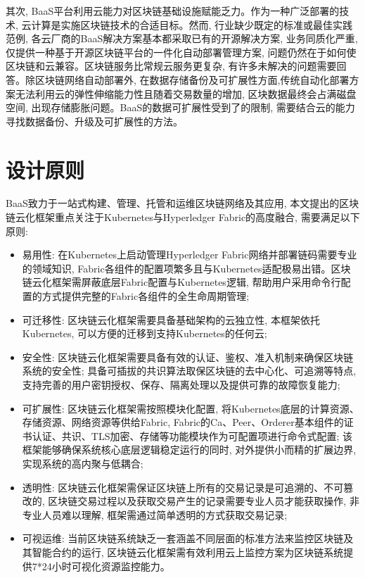 其次, BaaS平台利用云能力对区块链基础设施赋能乏力。作为一种广泛部署的技术, 云计算是实施区块链技术的合适目标。然而, 行业缺少既定的标准或最佳实践范例, 各云厂商的BaaS解决方案基本都采取已有的开源解决方案, 业务同质化严重, 仅提供一种基于开源区块链平台的一件化自动部署管理方案, 问题仍然在于如何使区块链和云兼容\cite{gai2020blockchain}。区块链服务比常规云服务更复杂, 有许多未解决的问题需要回答。除区块链网络自动部署外, 在数据存储备份及可扩展性方面,传统自动化部署方案无法利用云的弹性伸缩能力性且随着交易数量的增加, 区块数据最终会占满磁盘空间, 出现存储膨胀问题。BaaS的数据可扩展性受到了的限制, 需要结合云的能力寻找数据备份、升级及可扩展性的方法。

\section{设计原则}\label{section: framework_characteristics}

BaaS致力于一站式构建、管理、托管和运维区块链网络及其应用, 本文提出的区块链云化框架重点关注于Kubernetes与Hyperledger Fabric的高度融合, 需要满足以下原则:

\begin{itemize}[itemindent=2em]
    \item 易用性: 在Kubernetes上启动管理Hyperledger Fabric网络并部署链码需要专业的领域知识, Fabric各组件的配置项繁多且与Kubernetes适配极易出错。区块链云化框架需屏蔽底层Fabric配置与Kubernetes逻辑, 帮助用户采用命令行配置的方式提供完整的Fabric各组件的全生命周期管理;

    \item 可迁移性: 区块链云化框架需要具备基础架构的云独立性, 本框架依托Kubernetes, 可以方便的迁移到支持Kubernetes的任何云;

    \item 安全性: 区块链云化框架需要具备有效的认证、鉴权、准入机制来确保区块链系统的安全性; 具备可插拔的共识算法取保区块链的去中心化、可追溯等特点, 支持完善的用户密钥授权、保存、隔离处理以及提供可靠的故障恢复能力;

    \item 可扩展性: 区块链云化框架需按照模块化配置, 将Kubernetes底层的计算资源、存储资源、网络资源等供给Fabric, Fabric的Ca、Peer、Orderer基本组件的证书认证、共识、TLS加密、存储等功能模块作为可配置项进行命令式配置; 该框架能够确保系统核心底层逻辑稳定运行的同时, 对外提供小而精的扩展边界, 实现系统的高内聚与低耦合;

    \item 透明性: 区块链云化框架需保证区块链上所有的交易记录是可追溯的、不可篡改的, 区块链交易过程以及获取交易产生的记录需要专业人员才能获取操作, 非专业人员难以理解, 框架需通过简单透明的方式获取交易记录;

    \item 可视运维: 当前区块链系统缺乏一套涵盖不同层面的标准方法来监控区块链及其智能合约的运行\cite{zhangfuli2021smartcontract}, 区块链云化框架需有效利用云上监控方案为区块链系统提供7*24小时可视化资源监控能力。
\end{itemize}

